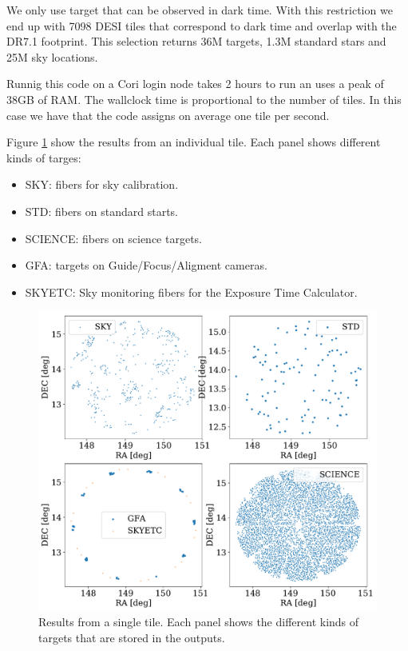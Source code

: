 \documentclass{article}
\begin{document}
We only use target that can be observed in dark time. 
With this restriction we end up with 7098 DESI tiles that correspond
to dark time and overlap with the DR7.1 footprint. 
This selection returns 36M targets, 1.3M standard stars and
25M sky locations.

Runnig this code on a Cori login node takes 2 hours to run an uses a
peak of 38GB of RAM.
The wallclock time is proportional to the number
of tiles. In this case we have that the code assigns on average one
tile per second. 

Figure \ref{fig:single_tile} show the results from an individual
tile. 
Each panel shows different kinds of targes: 
\begin{itemize}
\item SKY: fibers for sky calibration.
\item STD: fibers on standard starts.
\item SCIENCE: fibers on science targets.
\item GFA: targets on Guide/Focus/Aligment cameras.
\item SKYETC: Sky monitoring fibers for the Exposure Time Calculator.
\end{itemize}

\begin{figure}[!h]
\begin{center}
\begin{center}
\includegraphics[scale=0.30]{single_tile.pdf}
\end{center}
\caption{Results from a single tile.
Each panel shows the different kinds of targets that are stored
in the outputs.
\label{fig:single_tile}}
\end{center}
\end{figure}
\end{document}
